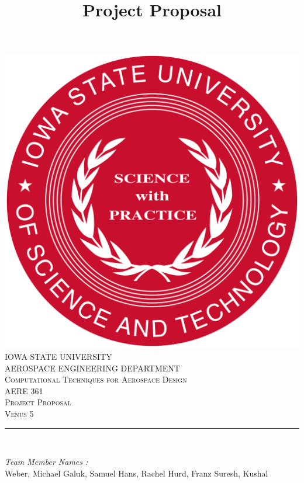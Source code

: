 \documentclass[12pt]{article}
\begin{document}
\title{Project Proposal}

\begin{titlepage}
	\centering
    \vspace*{0.5 cm}
    \includegraphics[scale = 0.11]{isu_seal.png}\\[1.0 cm]	%
    \textsc{\LARGE IOWA STATE UNIVERSITY}\\[2.0 cm]
    \textsc{\large AEROSPACE ENGINEERING DEPARTMENT}\\[0.2 cm]
    \textsc{\large Computational Techniques for Aerospace Design}\\[0.2 cm]
	\textsc{\Large AERE 361}\\[0.5 cm]				%
	\textsc{\Large Project Proposal}\\[0.2 cm]
	\textsc{\Large Venus 5}\\[0.2 cm]
	\rule{\linewidth}{0.2 mm} \\[0.4 cm]
	
	
	\begin{minipage}{0.8\textwidth}
		
			\begin{flushleft} 
			\emph{Team Member Names :} \\
			Weber, Michael\linebreak
			Galuk, Samuel\linebreak
			Hans, Rachel\linebreak
			Hurd, Franz\linebreak
			Suresh, Kushal\linebreak
			
			
		\end{flushleft}
	\end{minipage}\\[2 cm]
	
	\vfill
	
\end{titlepage}
\end{document}
